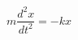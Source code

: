 \documentclass[preview]{standalone}
\begin{document}
\begin{align*}
m \dfrac{d^2x}{dt^2} = -k x
\end{align*}
\end{document}
